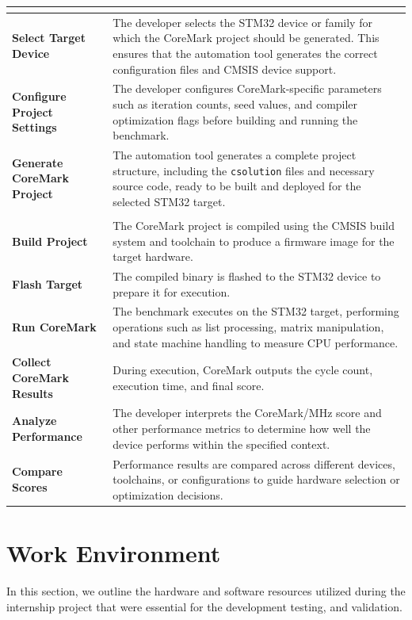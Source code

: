 \begin{xltabular}{\linewidth}{@{}>{\bfseries}l X@{}}
	 \\
	\midrule
	Select Target Device &
	The developer selects the STM32 device or family for which the CoreMark project should be generated. 
	This ensures that the automation tool generates the correct configuration files and CMSIS device support. \\
	\midrule
	Configure Project Settings &
	The developer configures CoreMark-specific parameters such as iteration counts, seed values, and compiler optimization flags 
	before building and running the benchmark. \\
	\midrule
	Generate CoreMark Project &
	The automation tool generates a complete project structure, including the \texttt{csolution} files and necessary source code, 
	ready to be built and deployed for the selected STM32 target. \\
	\midrule
	 \\
	\midrule
	Build Project &
	The CoreMark project is compiled using the CMSIS build system and toolchain to produce a firmware image for the target hardware. \\
	\midrule
	Flash Target &
	The compiled binary is flashed to the STM32 device to prepare it for execution.\\
	\midrule
	Run CoreMark &
	The benchmark executes on the STM32 target, performing operations such as list processing, matrix manipulation, and state machine handling 
	to measure CPU performance. \\
	\midrule
	Collect CoreMark Results &
	During execution, CoreMark outputs the cycle count, execution time, and final score. \\
	\midrule
	Analyze Performance &
	The developer interprets the CoreMark/MHz score and other performance metrics to determine how well the device performs within the specified context. \\
	\midrule
	Compare Scores &
	Performance results are compared across different devices, toolchains, or configurations to guide hardware selection or optimization decisions.
\end{xltabular}

\section*{Work Environment}
In this section, we outline the hardware and software resources utilized during the internship project that were essential for the development testing, and validation.

